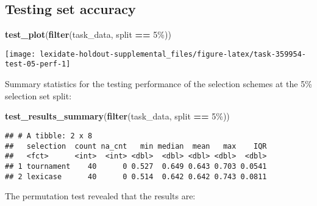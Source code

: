 \documentclass[
]{book}
\newenvironment{Shaded}{\begin{snugshade}}{\end{snugshade}}
\newcommand{\AttributeTok}[1]{\textcolor[rgb]{0.13,0.29,0.53}{#1}}
\newcommand{\DecValTok}[1]{\textcolor[rgb]{0.00,0.00,0.81}{#1}}
\newcommand{\FunctionTok}[1]{\textcolor[rgb]{0.13,0.29,0.53}{\textbf{#1}}}
\newcommand{\NormalTok}[1]{#1}
\newcommand{\OtherTok}[1]{\textcolor[rgb]{0.56,0.35,0.01}{#1}}
\newcommand{\SpecialCharTok}[1]{\textcolor[rgb]{0.81,0.36,0.00}{\textbf{#1}}}
\newcommand{\StringTok}[1]{\textcolor[rgb]{0.31,0.60,0.02}{#1}}
\begin{document}
\hypertarget{testing-set-accuracy-5}{%
\subsection{Testing set accuracy}\label{testing-set-accuracy-5}}

\begin{Shaded}
\begin{Highlighting}[]
\FunctionTok{test\_plot}\NormalTok{(}\FunctionTok{filter}\NormalTok{(task\_data, split }\SpecialCharTok{==} \StringTok{\textquotesingle{}5\%\textquotesingle{}}\NormalTok{))}
\end{Highlighting}
\end{Shaded}

\texttt{[image: lexidate-holdout-supplemental\_files/figure-latex/task-359954-test-05-perf-1]}

Summary statistics for the testing performance of the selection schemes at the 5\% selection set split:

\begin{Shaded}
\begin{Highlighting}[]
\FunctionTok{test\_results\_summary}\NormalTok{(}\FunctionTok{filter}\NormalTok{(task\_data, split }\SpecialCharTok{==} \StringTok{\textquotesingle{}5\%\textquotesingle{}}\NormalTok{))}
\end{Highlighting}
\end{Shaded}

\begin{verbatim}
## # A tibble: 2 x 8
##   selection  count na_cnt   min median  mean   max    IQR
##   <fct>      <int>  <int> <dbl>  <dbl> <dbl> <dbl>  <dbl>
## 1 tournament    40      0 0.527  0.649 0.643 0.703 0.0541
## 2 lexicase      40      0 0.514  0.642 0.642 0.743 0.0811
\end{verbatim}

The permutation test revealed that the results are:

\begin{Shaded}
\end{Shaded}
\end{document}
